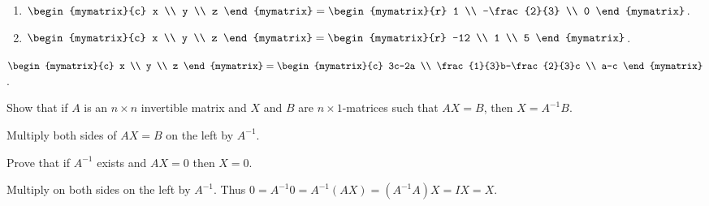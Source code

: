 \begin{enumialphparenastyle}
\begin{ex}
  \begin{sol}
    \begin{enumerate}
    \item $\def\arraystretch{1.2}
      \begin{mymatrix}{c}
        x \\
        y \\
        z
      \end{mymatrix} =\begin{mymatrix}{r}
        1 \\
        -\frac{2}{3} \\
        0
      \end{mymatrix}$.
    \item $\begin{mymatrix}{c}
        x \\
        y \\
        z
      \end{mymatrix} = \begin{mymatrix}{r}
        -12 \\
        1 \\
        5
      \end{mymatrix}$.
    \end{enumerate}
    $\def\arraystretch{1.2}
    \begin{mymatrix}{c}
      x \\
      y \\
      z
    \end{mymatrix} = 
    \begin{mymatrix}{c}
      3c-2a \\
      \frac{1}{3}b-\frac{2}{3}c \\
      a-c
    \end{mymatrix}$.
  \end{sol}
\end{ex}

\begin{ex}
  Show that if $A$ is an $n\times n$ invertible matrix and $X$ and $B$
  are $n\times 1$-matrices such that $AX=B$, then $X=A^{-1}B$.
  \begin{sol}
    Multiply both sides of $AX=B$ on the left by $A^{-1}$.
  \end{sol}
\end{ex}

\begin{ex}
  Prove that if $A^{-1}$ exists and $AX=0$ then $X=0$.
  \begin{sol}
    Multiply on both sides on the left by $A^{-1}$. Thus
    $0=A^{-1}0=A^{-1}(AX) =(A^{-1}A) X=IX = X$.
  \end{sol}
\end{ex}


\end{enumialphparenastyle}
